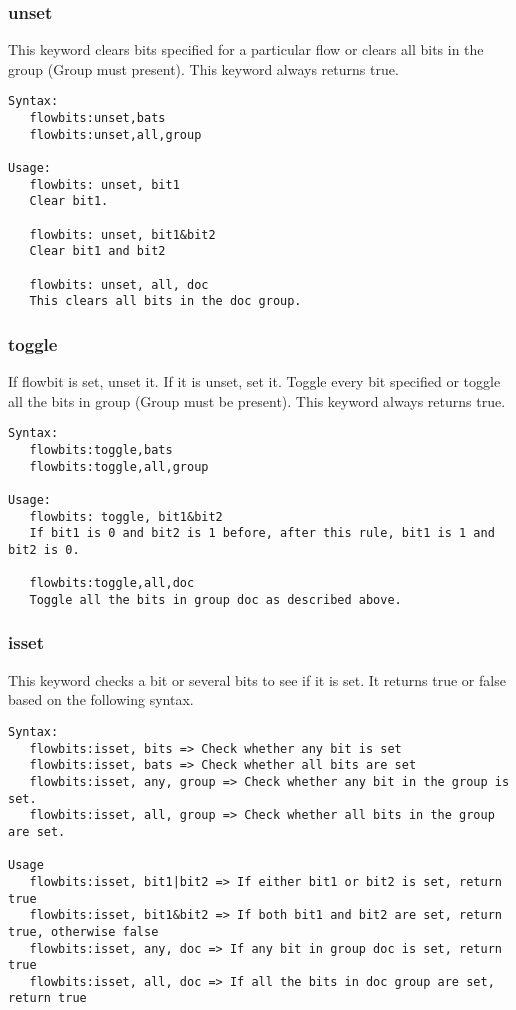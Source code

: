 \documentclass[english]{report}
\begin{document}
\subsubsection{unset}
This keyword clears bits specified for a particular flow or clears all bits in the 
group (Group must present). This keyword always returns true.

\begin{verbatim}
Syntax:
   flowbits:unset,bats
   flowbits:unset,all,group
   
Usage:  
   flowbits: unset, bit1  
   Clear bit1.
   
   flowbits: unset, bit1&bit2
   Clear bit1 and bit2
   
   flowbits: unset, all, doc
   This clears all bits in the doc group.
\end{verbatim}


\subsubsection{toggle}
If flowbit is set, unset it. If it is unset, set it. Toggle every bit specified or
toggle all the bits in group (Group must be present). This keyword always returns true.

\begin{verbatim}
Syntax:  
   flowbits:toggle,bats
   flowbits:toggle,all,group
   
Usage:
   flowbits: toggle, bit1&bit2
   If bit1 is 0 and bit2 is 1 before, after this rule, bit1 is 1 and bit2 is 0.
   
   flowbits:toggle,all,doc
   Toggle all the bits in group doc as described above. 
\end{verbatim}

\subsubsection{isset}
This keyword checks a bit or several bits to see if it is set.  It returns true or
false based on the following syntax.

\begin{verbatim}
Syntax:  
   flowbits:isset, bits => Check whether any bit is set
   flowbits:isset, bats => Check whether all bits are set
   flowbits:isset, any, group => Check whether any bit in the group is set.
   flowbits:isset, all, group => Check whether all bits in the group are set. 
   
Usage
   flowbits:isset, bit1|bit2 => If either bit1 or bit2 is set, return true
   flowbits:isset, bit1&bit2 => If both bit1 and bit2 are set, return true, otherwise false
   flowbits:isset, any, doc => If any bit in group doc is set, return true
   flowbits:isset, all, doc => If all the bits in doc group are set, return true 
\end{verbatim}
\end{document}
